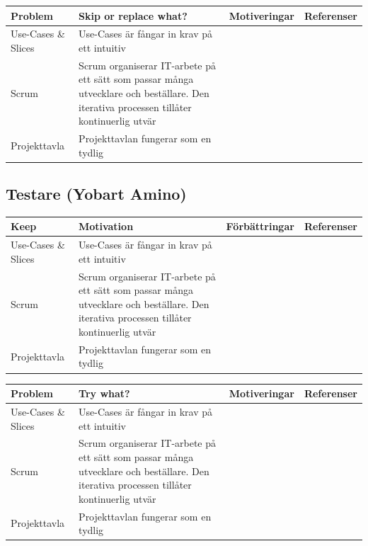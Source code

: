 \documentclass[conference,a4paper]{IEEEtran}
\newcommand\Tstrut{\rule{0pt}{2.6ex}}       %
\newcommand\Bstrut{\rule[-0.9ex]{0pt}{0pt}} %
\newcommand{\TBstrut}{\Tstrut\Bstrut} %
\begin{document}
\begin{table}[H]
	\small
  \centering
	\begin{tabular}{|p{1.5cm}|p{2cm}|p{1.8cm}|p{1.5cm}|} %
    \hline
    Problem & Skip or replace what? & Motiveringar & Referenser \TBstrut \\
    \hline
    Use-Cases \& Slices & Use-Cases är fångar in krav på ett intuitiv & & \TBstrut \\
    \hline
    Scrum & Scrum organiserar IT-arbete på ett sätt som passar många utvecklare och beställare. Den iterativa processen tillåter kontinuerlig utvär & & \TBstrut \\
    \hline
    Projekttavla & Projekttavlan fungerar som en tydlig & & \TBstrut \\
    \hline
  \end{tabular}
\end{table}


\subsection{Testare (Yobart Amino)}
\begin{table}[H]
	\small
  \centering
	\begin{tabular}{|p{1.5cm}|p{2cm}|p{1.8cm}|p{1.5cm}|} %
    \hline
    Keep & Motivation & Förbättringar & Referenser \TBstrut \\
    \hline
    Use-Cases \& Slices & Use-Cases är fångar in krav på ett intuitiv & & \TBstrut \\
    \hline
    Scrum & Scrum organiserar IT-arbete på ett sätt som passar många utvecklare och beställare. Den iterativa processen tillåter kontinuerlig utvär & & \TBstrut \\
    \hline
    Projekttavla & Projekttavlan fungerar som en tydlig & & \TBstrut \\
    \hline
  \end{tabular}
\end{table}

\begin{table}[H]
	\small
  \centering
	\begin{tabular}{|p{1.5cm}|p{2cm}|p{1.8cm}|p{1.5cm}|} %
    \hline
    Problem & Try what? & Motiveringar & Referenser \TBstrut \\
    \hline
    Use-Cases \& Slices & Use-Cases är fångar in krav på ett intuitiv & & \TBstrut \\
    \hline
    Scrum & Scrum organiserar IT-arbete på ett sätt som passar många utvecklare och beställare. Den iterativa processen tillåter kontinuerlig utvär & & \TBstrut \\
    \hline
    Projekttavla & Projekttavlan fungerar som en tydlig & & \TBstrut \\
    \hline
  \end{tabular}
\end{table}
\end{document}
